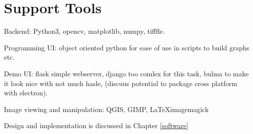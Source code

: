 \section{Support Tools}
\begin{comment}
You should also identify any support tools that you used. You should discuss your choice of implementation tools or simulation tools. For any code that you have written, you can talk about languages and related tools. For any simulation and analysis tools, identify the tools and how they are used on the project. 

For the parts of your project that need some engineering (hardware, software, firmware, or a mixture) to support the experiments, include details in your report about your design and implementation. You should discuss with your supervisor whether it is better to include a different top-level section to describe any engineering work.  In this template, Chapter 3 is suggested as a place for that discussion.
\end{comment}

Backend: Python3, opencv, matplotlib, numpy, tifffle.

Programming UI: object oriented python for ease of use in scripts to build graphs etc.

Demo UI: flask simple webserver, django too comlex for this task, bulma to make it look nice with not much hasle, (discuus potential to package cross platform with electron). 

Image viewing and manipulation: QGIS, GIMP, \LaTeX imagemagick


Design and implementation is discussed in Chapter \ref{software}


